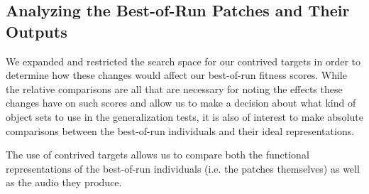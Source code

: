 \documentclass[12pt]{report} 	%
\numberwithin{figure}{chapter}
\numberwithin{table}{chapter}
\numberwithin{equation}{chapter}
\begin{document}
\begin{flushleft}
\subsection{Analyzing the Best-of-Run Patches and Their Outputs}
We expanded and restricted the search space for our contrived targets in order to determine how these changes would affect our best-of-run fitness scores. While the relative comparisons are all that are necessary for noting the effects these changes have on such scores and allow us to make a decision about what kind of object sets to use in the generalization tests, it is also of interest to make absolute comparisons between the best-of-run individuals and their ideal representations. 

The use of contrived targets allows us to compare both the functional representations of the best-of-run individuals (i.e. the patches themselves) as well as the audio they produce.


\end{flushleft}
\end{document}

